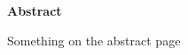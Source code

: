 \documentclass[../main.tex]{subfiles} %
\begin{document}
\begin{center} %
    \textbf{\textsf{Abstract}} %
\end{center}
\vspace{1em} %

Something on the abstract page
\end{document}
